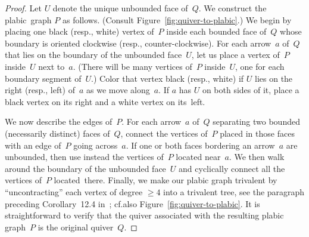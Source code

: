 \documentclass[10pt]{amsart}
\theoremstyle{definition}
\newcommand{\cf}{cf.}
\begin{document}
\begin{proof}
Let $U$ denote the unique unbounded face of~$Q$. 
We construct the plabic~graph $P$ as follows. 
(Consult Figure~\ref{fig:quiver-to-plabic}.) 
We begin by placing one black (resp., white) vertex of~$P$ inside each bounded face of~$Q$ 
whose boundary is oriented clockwise (resp., counter-clockwise). 
For each arrow~$a$ of~$Q$ that lies on the boundary of the unbounded face~$U$,
let us place a vertex of~$P$ inside~$U$ next to~$a$. 
(There will be many vertices of~$P$ inside~$U$, one for each boundary segment of~$U$.) 
Color that vertex black (resp., white) if $U$ lies on the right (resp., left) of~$a$ as we move along~$a$. 
If $a$ has $U$ on both sides of it, place a black vertex on its right and a white vertex on its~left. 

We now describe the edges of~$P$. 
For each arrow~$a$ of~$Q$ separating two bounded (necessarily distinct) faces of~$Q$, 
connect the vertices of~$P$ placed in those faces with an edge of~$P$ going across~$a$.
If one or both faces bordering an arrow~$a$ are unbounded, then use instead 
the vertices of~$P$ located near~$a$. 
We then walk around the boundary of the unbounded face~$U$ 
and cyclically connect all the vertices of~$P$ located~there. 
%
Finally, we make our plabic graph trivalent by ``uncontracting'' each vertex of degree $\ge 4$ into a trivalent tree, 
see the paragraph preceding Corollary~12.4 in~\cite{postnikov}; \cf also Figure~\ref{fig:quiver-to-plabic}.
%
It is straightforward to verify that the quiver associated with the resulting plabic graph~$P$
is the original quiver~$Q$. 
\end{proof}
\end{document}
